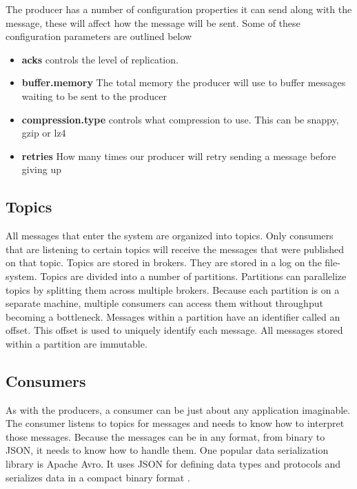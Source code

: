 The producer has a number of configuration properties it can send along with the message, these will affect how the message will be sent. Some of these configuration parameters are outlined below

\begin{itemize}
  \item \textbf{acks} controls the level of replication.
  \item \textbf{buffer.memory} The total memory the producer will use to buffer messages waiting to be sent to the producer
  \item \textbf{compression.type} controls what compression to use. This can be snappy, gzip or lz4
  \item \textbf{retries} How many times our producer will retry sending a message before giving up
\end{itemize}

\subsection{Topics}

All messages that enter the system are organized into topics. Only consumers that are listening to certain topics will receive the messages that were published on that topic. Topics are stored in brokers. They are stored in a log on the file-system. Topics are divided into a number of partitions. Partitions can parallelize topics by splitting them across multiple brokers. Because each partition is on a separate machine, multiple consumers can access them without throughput becoming a bottleneck. Messages within a partition have an identifier called an offset. This offset is used to uniquely identify each message. All messages stored within a partition are immutable.

\subsection{Consumers}

As with the producers, a consumer can be just about any application imaginable. The consumer listens to topics for messages and needs to know how to interpret those messages. Because the messages can be in any format, from binary to JSON, it needs to know how to handle them. One popular data serialization library is Apache Avro. It uses JSON for defining data types and protocols and serializes data in a compact binary format \cite{wiki:avro}.